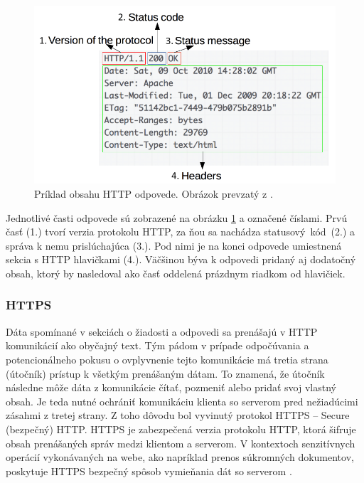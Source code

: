 \begin{figure}[htb!]
\begin{center}
    \includegraphics[scale=0.6]{obrazky-figures/http_response.png}
    \caption{Príklad obsahu HTTP odpovede. Obrázok prevzatý z \cite{mdn-docs-http-overview}.}
    \label{fig:http-response}
\end{center}
\end{figure}

Jednotlivé časti odpovede sú zobrazené na obrázku \ref{fig:http-response} a označené číslami. 
Prvú časť (1.) tvorí verzia protokolu HTTP, za ňou sa nachádza \mbox{statusový kód (2.)} a správa k nemu prislúchajúca (3.). 
Pod nimi je na konci odpovede umiestnená sekcia s HTTP hlavičkami (4.). 
Väčšinou býva k odpovedi pridaný aj dodatočný obsah, ktorý by nasledoval ako časť oddelená prázdnym riadkom od hlavičiek.

\pagebreak


\subsubsection{HTTPS}

Dáta spomínané v sekciách o žiadosti a odpovedi sa prenášajú v HTTP komunikácií ako obyčajný text. 
Tým pádom v prípade odpočúvania a potencionálneho pokusu o ovplyvnenie tejto komunikácie má tretia strana (útočník) prístup k všetkým prenášaným dátam. 
To znamená, že útočník následne môže dáta z komunikácie čítať, pozmeniť alebo pridať svoj vlastný obsah. 
Je teda nutné ochrániť komunikáciu klienta so serverom pred nežiadúcimi zásahmi z tretej strany. 
Z toho dôvodu bol vyvinutý protokol HTTPS -- Secure (bezpečný) HTTP.
HTTPS je zabezpečená verzia protokolu HTTP, ktorá šifruje obsah prenášaných správ medzi klientom a serverom.
V kontextoch senzitívnych operácií vykonávaných na webe, ako napríklad prenos súkromných dokumentov, poskytuje HTTPS bezpečný spôsob vymieňania dát so serverom \cite{cloudflare-http-not-secure}.


